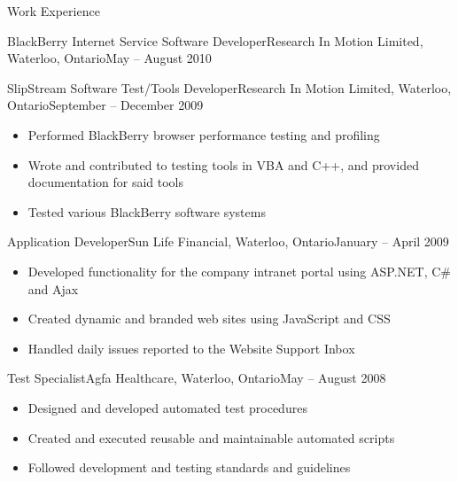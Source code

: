 \documentclass[11pt]{article}
\begin{document}
\begin{section}{Work Experience}
\begin{subsection}{BlackBerry Internet Service Software Developer}{Research In Motion Limited, Waterloo, Ontario}{May -- August 2010}
        \end{subsection}

		\begin{subsection}{SlipStream Software Test/Tools Developer}{Research In Motion Limited, Waterloo, Ontario}{September -- December 2009}

			\begin{itemize}
				\item Performed BlackBerry browser performance testing and profiling
				\item Wrote and contributed to testing tools in VBA and C++, and provided documentation for said tools
				\item Tested various BlackBerry software systems
			\end{itemize}

		\end{subsection}

		\begin{subsection}{Application Developer}{Sun Life Financial, Waterloo, Ontario}{January -- April 2009}

			\begin{itemize}
				\item Developed functionality for the company intranet portal using ASP.NET, C\# and Ajax
				\item Created dynamic and branded web sites using JavaScript and CSS
				\item Handled daily issues reported to the Website Support Inbox
			\end{itemize}

		\end{subsection}

		\begin{subsection}{Test Specialist}{Agfa Healthcare, Waterloo, Ontario}{May -- August 2008}

			\begin{itemize}
				\item Designed and developed automated test procedures
				\item Created and executed reusable and maintainable automated scripts
				\item Followed development and testing standards and guidelines
			\end{itemize}

		\end{subsection}

	\end{section}
\end{document}

